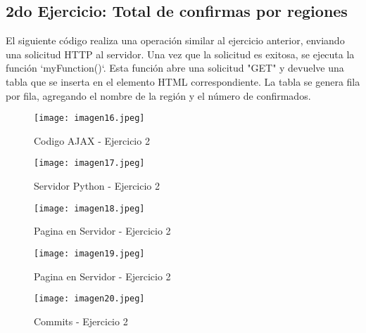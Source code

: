 \documentclass[10pt, a4paper]{article}
\begin{document}
	\subsection*{2do Ejercicio: Total de confirmas por regiones}
	\begin{flushleft}
		El siguiente código realiza una operación similar al ejercicio anterior, enviando una solicitud HTTP al servidor. Una vez que la solicitud es exitosa, se ejecuta la función `myFunction()`. Esta función abre una solicitud "GET" y devuelve una tabla que se inserta en el elemento HTML correspondiente. La tabla se genera fila por fila, agregando el nombre de la región y el número de confirmados.
	\end{flushleft}
	\begin{figure}[h]
		\centering
		\texttt{[image: imagen16.jpeg]}
		\caption{Codigo AJAX - Ejercicio 2}
	\end{figure}
	\begin{figure}[h]
		\centering
		\texttt{[image: imagen17.jpeg]}
		\caption{Servidor Python - Ejercicio 2}
	\end{figure}
	\begin{figure}[h]
		\centering
		\texttt{[image: imagen18.jpeg]}
		\caption{Pagina en Servidor - Ejercicio 2}
	\end{figure}
	\begin{figure}[h]
		\centering
		\texttt{[image: imagen19.jpeg]}
		\caption{Pagina en Servidor - Ejercicio 2}
	\end{figure}
	\begin{figure}[h]
		\centering
		\texttt{[image: imagen20.jpeg]}
		\caption{Commits - Ejercicio 2}
	\end{figure} 
	\vspace*{25cm}
\end{document}
